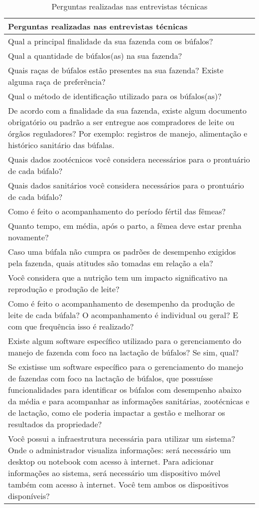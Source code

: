 \begin{table}[H]
\centering
\renewcommand{\arraystretch}{1.3}
\begin{tabular}{|>{\raggedright\arraybackslash}p{15cm}|}
\hline
\textbf{Perguntas realizadas nas entrevistas técnicas} \\
\hline
Qual a principal finalidade da sua fazenda com os búfalos? \\
\hline
Qual a quantidade de búfalos(as) na sua fazenda? \\
\hline
Quais raças de búfalos estão presentes na sua fazenda? Existe alguma raça de preferência? \\
\hline
Qual o método de identificação utilizado para os búfalos(as)? \\
\hline
De acordo com a finalidade da sua fazenda, existe algum documento obrigatório ou padrão a ser entregue aos compradores de leite ou órgãos reguladores? Por exemplo: registros de manejo, alimentação e histórico sanitário das búfalas. \\
\hline
Quais dados zootécnicos você considera necessários para o prontuário de cada búfalo? \\
\hline
Quais dados sanitários você considera necessários para o prontuário de cada búfalo? \\
\hline
Como é feito o acompanhamento do período fértil das fêmeas? \\
\hline
Quanto tempo, em média, após o parto, a fêmea deve estar prenha novamente? \\
\hline
Caso uma búfala não cumpra os padrões de desempenho exigidos pela fazenda, quais atitudes são tomadas em relação a ela? \\
\hline
Você considera que a nutrição tem um impacto significativo na reprodução e produção de leite? \\
\hline
Como é feito o acompanhamento de desempenho da produção de leite de cada búfala? O acompanhamento é individual ou geral? E com que frequência isso é realizado? \\
\hline
Existe algum software específico utilizado para o gerenciamento do manejo de fazenda com foco na lactação de búfalos? Se sim, qual? \\
\hline
Se existisse um software específico para o gerenciamento do manejo de fazendas com foco na lactação de búfalos, que possuísse funcionalidades para identificar os búfalos com desempenho abaixo da média e para acompanhar as informações sanitárias, zootécnicas e de lactação, como ele poderia impactar a gestão e melhorar os resultados da propriedade? \\
\hline
Você possui a infraestrutura necessária para utilizar um sistema? Onde o administrador visualiza informações: será necessário um desktop ou notebook com acesso à internet. Para adicionar informações ao sistema, será necessário um dispositivo móvel também com acesso à internet. Você tem ambos os dispositivos disponíveis? \\
\hline
\end{tabular}
\caption{Perguntas realizadas nas entrevistas técnicas}
\end{table}

